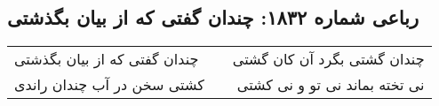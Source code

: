 \begin{center}
\section*{رباعی شماره ۱۸۳۲: چندان گفتی که از بیان بگذشتی}
\label{sec:1832}
\begin{longtable}{l p{0.5cm} r}
چندان گفتی که از بیان بگذشتی
&&
چندان گشتی بگرد آن کان گشتی
\\
کشتی سخن در آب چندان راندی
&&
نی تخته بماند نی تو و نی کشتی
\\
\end{longtable}
\end{center}
